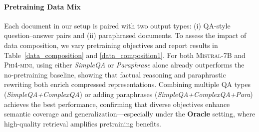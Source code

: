 \documentclass{applemlr}
\numberwithin{equation}{section}
\begin{document}
\paragraph{Pretraining Data Mix}

Each document in our setup is paired with two output types: (i) QA-style question–answer pairs and (ii) paraphrased documents.
To assess the impact of data composition, we vary pretraining objectives and report results in Table~\ref{data_composition} and \ref{data_composition1}.
For both \textsc{Mistral-7B} and \textsc{Phi4-mini}, using either \textit{SimpleQA} or \textit{Paraphrase} alone already outperforms the no-pretraining baseline, showing that factual reasoning and paraphrastic rewriting both enrich compressed representations.
Combining multiple QA types (\textit{SimpleQA+ComplexQA}) or adding paraphrases (\textit{SimpleQA+ComplexQA+Para}) achieves the best performance, confirming that diverse objectives enhance semantic coverage and generalization—especially under the \textbf{Oracle} setting, where high-quality retrieval amplifies pretraining benefits.
\end{document}

